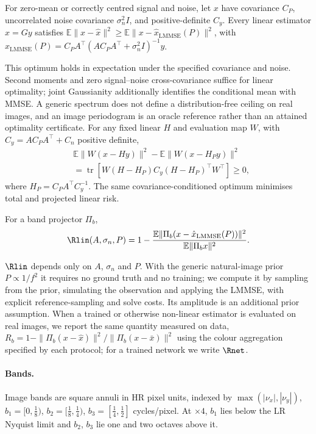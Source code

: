 \begin{proposition}\label{prop:bound}
For zero-mean or correctly centred signal and noise, let $x$ have covariance $C_P$, uncorrelated noise covariance $\sigma_n^2I$, and positive-definite $C_y$. Every linear
estimator $\hat x=Gy$ satisfies
$\mathbb{E}\|x-\hat x\|^2\ge\mathbb{E}\|x-\hat x_{\mathrm{LMMSE}}(P)\|^2$,
with $\hat x_{\mathrm{LMMSE}}(P)=C_PA^\top(AC_PA^\top+\sigma_n^2I)^{-1}y$.
\end{proposition}
This optimum holds in expectation under the specified covariance and noise.
Second moments and zero signal--noise cross-covariance suffice for linear
optimality; joint Gaussianity additionally identifies the conditional mean
with MMSE. A generic spectrum does not define a distribution-free ceiling
on real images, and an image periodogram is an oracle reference rather than
an attained optimality certificate. For any fixed linear $H$ and evaluation
map $W$, with $C_y=AC_PA^\top+C_n$ positive definite,
\begin{align*}
&\mathbb E\|W(x-Hy)\|^2-\mathbb E\|W(x-H_Py)\|^2\\
&=\operatorname{tr}[W(H-H_P)C_y(H-H_P)^\top W^\top]\ge0,
\end{align*}
where $H_P=C_PA^\top C_y^{-1}$. The same covariance-conditioned optimum
minimises total and projected linear risk.

\begin{definition}
For a band projector $\Pi_b$,
\[
\Rlin(A,\sigma_n,P)=1-\frac{\mathbb{E}\|\Pi_b(x-\hat x_{\mathrm{LMMSE}}(P))\|^2}{\mathbb{E}\|\Pi_b x\|^2}.
\]
\end{definition}
$\Rlin$ depends only on $A$, $\sigma_n$ and $P$. With the generic natural-image
prior $P\propto1/f^2$ it requires no ground truth and no training; we compute
it by sampling from the prior, simulating the observation and applying the
LMMSE, with explicit reference-sampling and solve costs. Its amplitude is an additional prior assumption. When a trained or otherwise non-linear estimator
is evaluated on real images, we report the same quantity measured on data,
$R_b=1-\|\Pi_b(x-\hat x)\|^2/\|\Pi_b(x-\bar x)\|^2$ using the colour aggregation specified by each protocol;
for a trained network we write $\Rnet$.

\paragraph{Bands.} Image bands are square annuli in HR pixel units, indexed by $\max(|\nu_x|,|\nu_y|)$,
$b_1=[0,\tfrac18)$, $b_2=[\tfrac18,\tfrac14)$, $b_3=[\tfrac14,\tfrac12]$
cycles/pixel. At $\times4$, $b_1$ lies below the LR Nyquist limit and
$b_2$, $b_3$ lie one and two octaves above it.

